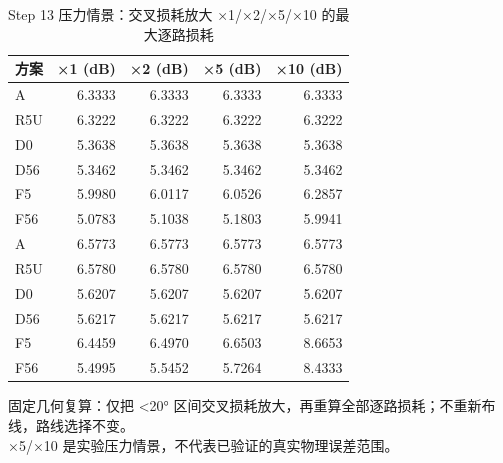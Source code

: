 \begin{table}[htbp]
  \centering
  \caption{Step 13 压力情景：交叉损耗放大 ×1/×2/×5/×10 的最大逐路损耗}
  \label{tab:step13-sensitivity}
  \begin{tabular}{lrrrr}
    \toprule
    方案 & ×1 (dB) & ×2 (dB) & ×5 (dB) & ×10 (dB) \\
    \midrule
    A & 6.3333 & 6.3333 & 6.3333 & 6.3333 \\
    R5U & 6.3222 & 6.3222 & 6.3222 & 6.3222 \\
    D0 & 5.3638 & 5.3638 & 5.3638 & 5.3638 \\
    D56 & 5.3462 & 5.3462 & 5.3462 & 5.3462 \\
    F5 & 5.9980 & 6.0117 & 6.0526 & 6.2857 \\
    F56 & 5.0783 & 5.1038 & 5.1803 & 5.9941 \\
    \midrule
    A & 6.5773 & 6.5773 & 6.5773 & 6.5773 \\
    R5U & 6.5780 & 6.5780 & 6.5780 & 6.5780 \\
    D0 & 5.6207 & 5.6207 & 5.6207 & 5.6207 \\
    D56 & 5.6217 & 5.6217 & 5.6217 & 5.6217 \\
    F5 & 6.4459 & 6.4970 & 6.6503 & 8.6653 \\
    F56 & 5.4995 & 5.5452 & 5.7264 & 8.4333 \\
    \bottomrule
  \end{tabular}
  \par\vspace{2pt}
  \begin{flushleft}\footnotesize
  固定几何复算：仅把 <20° 区间交叉损耗放大，再重算全部逐路损耗；不重新布线，路线选择不变。 \\
  ×5/×10 是实验压力情景，不代表已验证的真实物理误差范围。 \\
  \end{flushleft}
\end{table}
